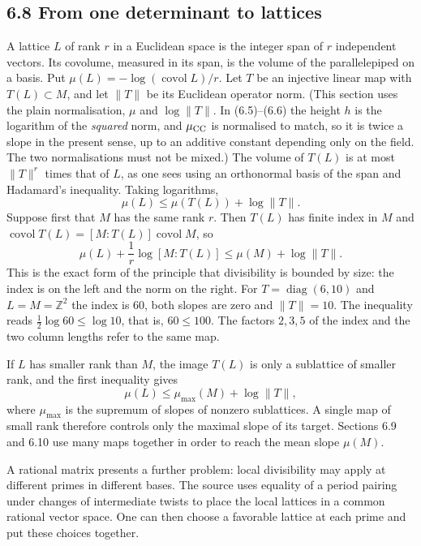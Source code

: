 \documentclass[11pt,letterpaper]{article}
\begin{document}
{\newpage
\subsection*{6.8 From one determinant to lattices}

A lattice $L$ of rank $r$ in a Euclidean space is the integer span of $r$ independent vectors. Its covolume, measured in its span, is the volume of the parallelepiped on a basis. Put $\mu(L)=-\log(\operatorname{covol}L)/r$. Let $T$ be an injective linear map with $T(L)\subset M$, and let $\|T\|$ be its Euclidean operator norm. (This section uses the plain normalisation, $\mu$ and $\log\|T\|$. In (6.5)--(6.6) the height $h$ is the logarithm of the \emph{squared} norm, and $\mu_{\rm CC}$ is normalised to match, so it is twice a slope in the present sense, up to an additive constant depending only on the field. The two normalisations must not be mixed.) The volume of $T(L)$ is at most $\|T\|^r$ times that of $L$, as one sees using an orthonormal basis of the span and Hadamard's inequality. Taking logarithms,
\begin{equation}\label{D:99}
 \mu(L)\le \mu(T(L))+\log\|T\| .
\end{equation}
Suppose first that $M$ has the same rank $r$. Then $T(L)$ has finite index in $M$ and $\operatorname{covol}T(L)=[M:T(L)]\operatorname{covol}M$, so
\begin{equation}\label{D:100}
 \mu(L)+\frac1r\log[M:T(L)]\le \mu(M)+\log\|T\| .
\end{equation}
This is the exact form of the principle that divisibility is bounded by size: the index is on the left and the norm on the right. For $T=\operatorname{diag}(6,10)$ and $L=M=\mathbb Z^2$ the index is $60$, both slopes are zero and $\|T\|=10$. The inequality reads $\tfrac12\log60\le\log10$, that is, $60\le100$. The factors $2,3,5$ of the index and the two column lengths refer to the same map.

If $L$ has smaller rank than $M$, the image $T(L)$ is only a sublattice of smaller rank, and the first inequality gives
\begin{equation}\label{D:101}
 \mu(L)\le \mu_{\max}(M)+\log\|T\|,
\end{equation}
where $\mu_{\max}$ is the supremum of slopes of nonzero sublattices. A single map of small rank therefore controls only the maximal slope of its target. Sections 6.9 and 6.10 use many maps together in order to reach the mean slope $\mu(M)$.

A rational matrix presents a further problem: local divisibility may apply at different primes in different bases. The source uses equality of a period pairing under changes of intermediate twists to place the local lattices in a common rational vector space. One can then choose a favorable lattice at each prime and put these choices together.

}
\end{document}
